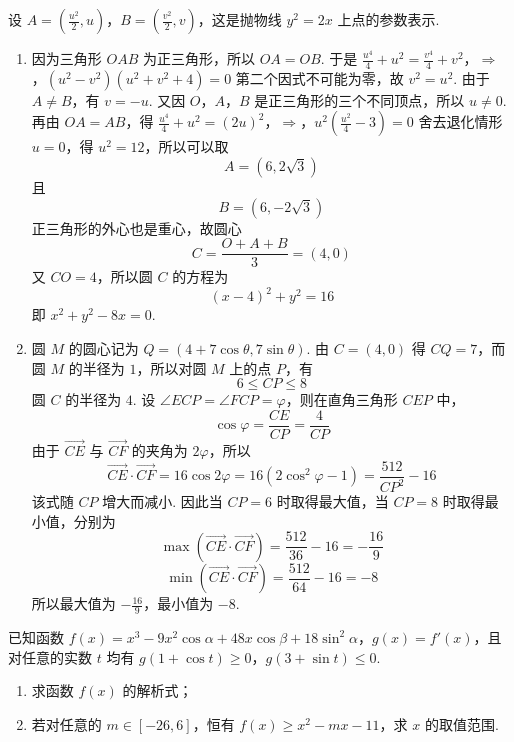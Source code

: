 \begin{solution}
设 \(A=(\frac{u^2}{2},u)\)，\(B=(\frac{v^2}{2},v)\)，这是抛物线 \(y^2=2x\) 上点的参数表示.
\begin{enumerate}
\item 因为三角形 \(OAB\) 为正三角形，所以 \(OA=OB\). 于是
\(\frac{u^4}{4}+u^2=\frac{v^4}{4}+v^2\)，\(\Longrightarrow\)，\((u^2-v^2)(u^2+v^2+4)=0\)
第二个因式不可能为零，故 \(v^2=u^2\). 由于 \(A\neq B\)，有 \(v=-u\). 又因 \(O\)，\(A\)，\(B\) 是正三角形的三个不同顶点，所以 \(u\neq0\). 再由 \(OA=AB\)，得
\(\frac{u^4}{4}+u^2=(2u)^2\)，\(\Longrightarrow\)，\(u^2\left(\frac{u^2}{4}-3\right)=0\)
舍去退化情形 \(u=0\)，得 \(u^2=12\)，所以可以取
\[
A=(6,2\sqrt{3})
\]
且
\[
B=(6,-2\sqrt{3})
\]
正三角形的外心也是重心，故圆心
\[
C=\frac{O+A+B}{3}=(4,0)
\]
又 \(CO=4\)，所以圆 \(C\) 的方程为
\[
(x-4)^2+y^2=16
\]
即 \(x^2+y^2-8x=0\).
\item 圆 \(M\) 的圆心记为 \(Q=(4+7\cos\theta,7\sin\theta)\). 由 \(C=(4,0)\) 得 \(CQ=7\)，而圆 \(M\) 的半径为 \(1\)，所以对圆 \(M\) 上的点 \(P\)，有
\[
6\leqslant CP\leqslant8
\]
圆 \(C\) 的半径为 \(4\). 设 \(\angle ECP=\angle FCP=\varphi\)，则在直角三角形 \(CEP\) 中，
\[
\cos\varphi=\frac{CE}{CP}=\frac{4}{CP}
\]
由于 \(\overrightarrow{CE}\) 与 \(\overrightarrow{CF}\) 的夹角为 \(2\varphi\)，所以
\[
\overrightarrow{CE}\cdot\overrightarrow{CF}
=16\cos2\varphi
=16\left(2\cos^2\varphi-1\right)
=\frac{512}{CP^2}-16
\]
该式随 \(CP\) 增大而减小. 因此当 \(CP=6\) 时取得最大值，当 \(CP=8\) 时取得最小值，分别为
\[
\max\left(\overrightarrow{CE}\cdot\overrightarrow{CF}\right)=\frac{512}{36}-16=-\frac{16}{9}
\]
\[
\min\left(\overrightarrow{CE}\cdot\overrightarrow{CF}\right)=\frac{512}{64}-16=-8
\]
所以最大值为 \(-\frac{16}{9}\)，最小值为 \(-8\).
\end{enumerate}
\end{solution}

\begin{problem}
已知函数 \(f(x)=x^3-9x^2\cos\alpha+48x\cos\beta+18\sin^2\alpha\)，\(g(x)=f'(x)\)，且对任意的实数 \(t\) 均有 \(g(1+\cos t)\geqslant0\)，\(g(3+\sin t)\leqslant0\).

\begin{enumerate}
\item 求函数 \(f(x)\) 的解析式；
\item 若对任意的 \(m\in[-26,6]\)，恒有 \(f(x)\geqslant x^2-mx-11\)，求 \(x\) 的取值范围.
\end{enumerate}
\end{problem}

